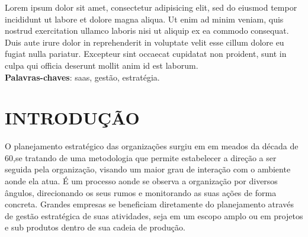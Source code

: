 \documentclass{abnt}
\begin{document}





 

\capa 
\folhaderosto 


\begin{resumo}

Lorem ipsum dolor sit amet, consectetur adipisicing elit, sed do eiusmod
tempor incididunt ut labore et dolore magna aliqua. Ut enim ad minim veniam,
quis nostrud exercitation ullamco laboris nisi ut aliquip ex ea commodo
consequat. Duis aute irure dolor in reprehenderit in voluptate velit esse
cillum dolore eu fugiat nulla pariatur. Excepteur sint occaecat cupidatat non
proident, sunt in culpa qui officia deserunt mollit anim id est laborum.\\


\textbf{Palavras-chaves}: saas, gestão, estratégia. 
\end{resumo}

\sumario %
\renewcommand*\listfigurename{LISTA DE FIGURAS}
\listoffigures %



\chapter{INTRODUÇÃO}

O planejamento estratégico das organizações surgiu em em meados da década de 60,se
tratando de uma metodologia que permite estabelecer a direção a ser seguida pela
organização, visando um maior grau de interação com o ambiente aonde ela atua. É um
processo aonde se observa a organização por diversos ângulos, direcionando os seus rumos e
monitorando as suas ações de forma concreta. Grandes empresas se beneficiam diretamente
do planejamento através de gestão estratégica de suas atividades, seja em um escopo amplo ou
em projetos e sub produtos dentro de sua cadeia de produção.
\end{document}
